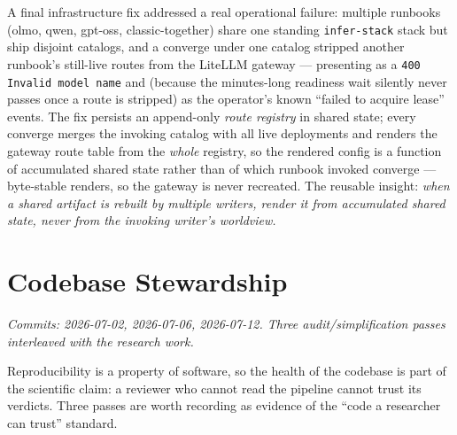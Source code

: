 \documentclass[11pt]{report}
\newcommand{\code}[1]{\texttt{#1}}
\begin{document}
A final infrastructure fix addressed a real operational failure: multiple runbooks
(olmo, qwen, gpt-oss, classic-together) share one standing \code{infer-stack} stack
but ship disjoint catalogs, and a converge under one catalog stripped another
runbook's still-live routes from the LiteLLM gateway --- presenting as a
\code{400 Invalid model name} and (because the minutes-long readiness wait silently
never passes once a route is stripped) as the operator's known ``failed to acquire
lease'' events. The fix persists an append-only \emph{route registry} in shared
state; every converge merges the invoking catalog with all live deployments and
renders the gateway route table from the \emph{whole} registry, so the rendered
config is a function of accumulated shared state rather than of which runbook
invoked converge --- byte-stable renders, so the gateway is never recreated. The
reusable insight: \emph{when a shared artifact is rebuilt by multiple writers,
render it from accumulated shared state, never from the invoking writer's
worldview.}

\chapter{Codebase Stewardship}
\label{chap:stewardship}

\emph{Commits: 2026-07-02, 2026-07-06, 2026-07-12. Three audit/simplification
passes interleaved with the research work.}

Reproducibility is a property of software, so the health of the codebase is part of
the scientific claim: a reviewer who cannot read the pipeline cannot trust its
verdicts. Three passes are worth recording as evidence of the ``code a researcher
can trust'' standard.
\end{document}
